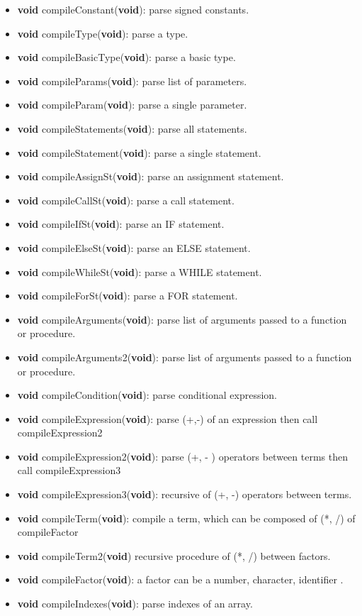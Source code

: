 \documentclass[12pt, a4paper]{report}
\begin{document}
\begin{itemize}
      			\item \textbf{void} compileConstant(\textbf{void}): parse signed constants.
      			\item \textbf{void} compileType(\textbf{void}): parse a type.
      			\item \textbf{void} compileBasicType(\textbf{void}): parse a basic type.
      			\item \textbf{void} compileParams(\textbf{void}): parse list of parameters.
      			\item \textbf{void} compileParam(\textbf{void}): parse a single parameter.
      			\item \textbf{void} compileStatements(\textbf{void}): parse all statements.
      			\item \textbf{void} compileStatement(\textbf{void}): parse a single statement.  
     			\item \textbf{void} compileAssignSt(\textbf{void}): parse an assignment statement.
      			\item \textbf{void} compileCallSt(\textbf{void}): parse a call statement.
      			\item \textbf{void} compileIfSt(\textbf{void}): parse an IF statement.
      			\item \textbf{void} compileElseSt(\textbf{void}): parse an ELSE statement.
      			\item \textbf{void} compileWhileSt(\textbf{void}): parse a WHILE statement.
      			\item \textbf{void} compileForSt(\textbf{void}): parse a FOR statement.
      			\item \textbf{void} compileArguments(\textbf{void}): parse list of arguments passed to a function or procedure.
      			\item \textbf{void} compileArguments2(\textbf{void}): parse list of arguments passed to a function or procedure.
      			\item \textbf{void} compileCondition(\textbf{void}): parse conditional expression.
      			\item \textbf{void} compileExpression(\textbf{void}): parse (+,-) of an expression then call compileExpression2
      			\item \textbf{void} compileExpression2(\textbf{void}): parse (+, - ) operators between terms then call compileExpression3
      			\item \textbf{void} compileExpression3(\textbf{void}): recursive of (+, -) operators between terms.
      			\item \textbf{void} compileTerm(\textbf{void}): compile a term, which can be composed of (*, /) of compileFactor
      			\item \textbf{void} compileTerm2(\textbf{void}) recursive procedure of (*, /) between factors.
      			\item \textbf{void} compileFactor(\textbf{void}): a factor can be a number, character, identifier .
      			\item \textbf{void} compileIndexes(\textbf{void}): parse indexes of an array.
			\end{itemize}
\end{document}
